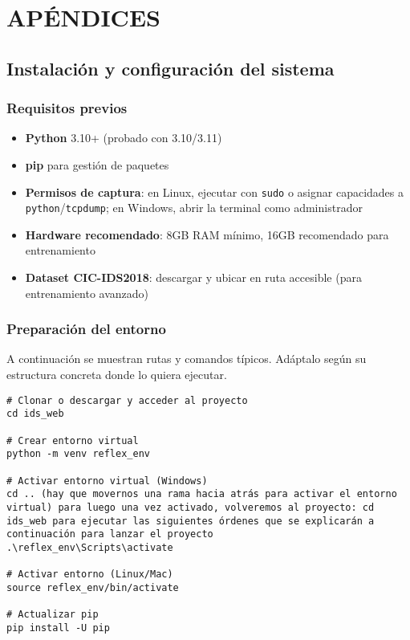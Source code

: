 \chapter{APÉNDICES}
\section{Instalación y configuración del sistema}

\subsection*{Requisitos previos}
\begin{itemize}
  \item \textbf{Python} 3.10+ (probado con 3.10/3.11)
  \item \textbf{pip} para gestión de paquetes
  \item \textbf{Permisos de captura}: en Linux, ejecutar con \texttt{sudo} o asignar capacidades a \texttt{python}/\texttt{tcpdump}; en Windows, abrir la terminal como administrador
  \item \textbf{Hardware recomendado}: 8GB RAM mínimo, 16GB recomendado para entrenamiento
  \item \textbf{Dataset CIC-IDS2018}: descargar y ubicar en ruta accesible (para entrenamiento avanzado)
\end{itemize}

\subsection*{Preparación del entorno}

A continuación se muestran rutas y comandos típicos. Adáptalo según su estructura concreta donde lo quiera ejecutar.
\begin{lstlisting}[style=tfgbash,caption={Configuración inicial del proyecto},label=List.EnvSetup]
# Clonar o descargar y acceder al proyecto
cd ids_web 

# Crear entorno virtual
python -m venv reflex_env

# Activar entorno virtual (Windows)
cd .. (hay que movernos una rama hacia atrás para activar el entorno virtual) para luego una vez activado, volveremos al proyecto: cd ids_web para ejecutar las siguientes órdenes que se explicarán a continuación para lanzar el proyecto
.\reflex_env\Scripts\activate     

# Activar entorno (Linux/Mac)
source reflex_env/bin/activate

# Actualizar pip
pip install -U pip
\end{lstlisting}

